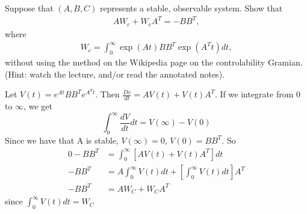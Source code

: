 \documentclass[12pt,A4, onecolumn]{exam}
\begin{document}
\begin{questions}
\begin{solution}
\begin{parts}
  \end{parts}
\end{solution}

\newpage 

 \question[10] 

Suppose that $(A,B,C)$ represents a stable, observable system. Show that
\begin{align}
  AW_c + W_cA^T = - BB^T,
\end{align}
where
\begin{align}
  W_c = \int_0^\infty \exp(At) BB^T \exp(A^Tt)dt,
\end{align}
without using the method on the Wikipedia page on the controlability Gramian. (Hint: watch the lecture, and/or read the annotated notes).

\begin{solution}
  Let $ V(t) = e^{At} BB^T e^{A^T t}  $. Then $ \frac{ Dv }{ dt } = AV(t) + V(t)A^T $. If we integrate from 0 to $ \infty $, we get
  \[
      \int_{0}^{\infty} \frac{ dV }{ dt }dt = V( \infty) - V(0)  
  \]
  Since we have that A is stable, $ V(\infty ) =0$, $ V(0) = BB^T $. So
  \begin{align*}
    0 - BB^T &= \int_{0}^{\infty} \left[ AV(t) + V(t) A^T\right]dt  \\
    -BB^T &= A \int_{0}^{\infty} V(t) dt + \left[ \int_{0}^{\infty} V(t)  dt  \right]A^T   \\
    -BB^T &= AW_C + W_C A^T 
  \end{align*}
  since $ \int_{0}^{\infty} V(t) dt = W_C   $ 
    
    
     
\end{solution}

\end{questions}
\end{document}
